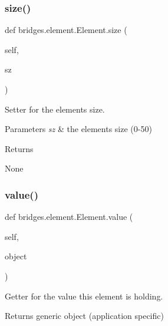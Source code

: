 \subsubsection{\texorpdfstring{size()}{size()}\hspace{0.1cm}{\footnotesize\ttfamily [2/2]}}
{\footnotesize\ttfamily def bridges.\+element.\+Element.\+size (\begin{DoxyParamCaption}\item[{}]{self,  }\item[{}]{sz }\end{DoxyParamCaption})}



Setter for the element\textquotesingle{}s size. 


\begin{DoxyParams}{Parameters}
{\em sz} & the element\textquotesingle{}s size (0-\/50) \\
\hline
\end{DoxyParams}
\begin{DoxyReturn}{Returns}


None 
\end{DoxyReturn}
\mbox{\label{classbridges_1_1element_1_1_element_ab89d51b751ad0956d7ec855c35335ad2}} 
\subsubsection{\texorpdfstring{value()}{value()}\hspace{0.1cm}{\footnotesize\ttfamily [1/2]}}
{\footnotesize\ttfamily def bridges.\+element.\+Element.\+value (\begin{DoxyParamCaption}\item[{}]{self,  }\item[{}]{object }\end{DoxyParamCaption})}



Getter for the value this element is holding. 

\begin{DoxyReturn}{Returns}
generic object (application specific) 
\end{DoxyReturn}
\mbox{\label{classbridges_1_1element_1_1_element_a810c122a8b900f476601d565291bdbf8}} 
